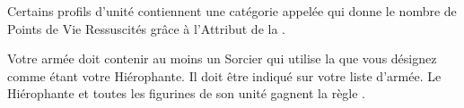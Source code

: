 \newcommand{\phatepscurserule}{%
Le \casketofphatep{} possède un \boundspell{4} : \sandsspellfour{} (\Pathof{} \sands{}). Il ne peut l'utiliser que s'il ne s'est pas déplacé durant ce Tour de Joueur.
}


\newcommand{\charnelcatapultrule}{%
\textbf{\artilleryweapon} de type \textbf{\catapult{} (\distance{3})}.\newline
\range{12-60}, \Strength{} 3 [9], [\multiplewounds{\ordnance}{}].
}

\newcommand{\cursedammunitionrule}{%
\textbf{\artilleryweapon} de type \textbf{\catapult{} (\distance{5})}.\newline
\range{12-48}, \Strength{} 3, \flamingattacks{}, \magicalattacks{}.

Une unité qui subit au moins une perte causée par cette arme doit subir un test de Panique comme si elle avait subi au moins 25\% de pertes. Ce test est fait avec un malus de -1 en Commandement.
}


\newcommand{\QRSnote}{%
\noindent\refsymbol{} Perd les \charioteers{} quand il sert de monture.
}

\newcommand{\allcharacters}{Personnages}
\newcommand{\allundeadconstructs}{Constructions Mort-Vivantes}
\newcommand{\allwarmachines}{Machines de Guerre}
















\startarmywiderules

\armyspecialruleentry{\risen}

Certains profils d'unité contiennent une catégorie appelée \risen{} qui donne le nombre de Points de Vie Ressuscités grâce à l'Attribut \sandsattribute{} de la \Pathof{} \sands{}.


Votre armée doit contenir au moins un Sorcier qui utilise la \Pathof{} \sands{} que vous désignez comme étant votre Hiérophante. Il doit être indiqué sur votre liste d'armée. Le Hiérophante et toutes les figurines de son unité gagnent la règle .

\closearmywiderules








